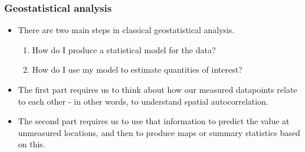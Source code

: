 \documentclass[parskip,12pt]{beamer}
\begin{document}
\begin{frame}
\frametitle{Geostatistical analysis}
 \begin{itemize}
\item There are two main steps in classical geostatistical analysis.
\vspace{2mm}
\begin{enumerate}
\item How do I produce a statistical model for the data?
\vspace{2mm}
\item How do I use my model to estimate quantities of interest?
\end{enumerate}
\vspace{3mm}
\item The first part requires us to think about how our measured datapoints relate to each other - in other words, to understand spatial autocorrelation.
\vspace{3mm}
\item The second part requires us to use that information to predict the value at unmeasured locations, and then to produce maps or summary statistics based on this.
\end{itemize}
\end{frame}
\end{document}
